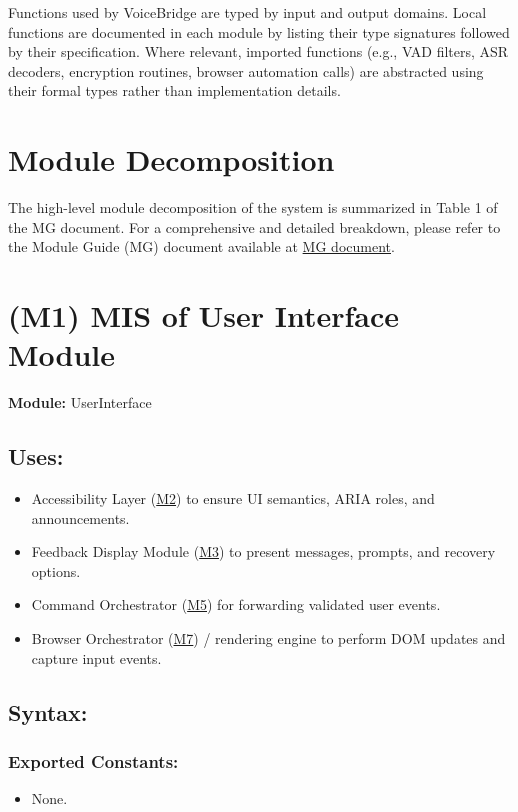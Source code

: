 \documentclass[12pt, titlepage]{article}
\begin{document}
\noindent
Functions used by VoiceBridge are typed by input and output domains.  
Local functions are documented in each module by listing their type signatures followed by their specification.
Where relevant, imported functions (e.g., VAD filters, ASR decoders, encryption routines, browser automation calls) are abstracted using their formal types rather than implementation details.



\section{Module Decomposition}
The high-level module decomposition of the system is summarized in Table 1 of the MG document. For a comprehensive and detailed breakdown, please refer to the Module Guide (MG) document available at \href{https://github.com/speech-buddies/VoiceBridge/blob/main/docs/Design/SoftArchitecture/MG.pdf}{MG document}.

\newpage
\section{(M1) MIS of User Interface Module} \label{M1}


\textbf{Module:} UserInterface

\subsection{Uses:}
\begin{itemize}
  \item Accessibility Layer (\hyperref[M2]{M2}) to ensure UI semantics, ARIA roles, and announcements.
  \item Feedback Display Module (\hyperref[M3]{M3}) to present messages, prompts, and recovery options.
  \item Command Orchestrator (\hyperref[M5]{M5}) for forwarding validated user events.
  \item Browser Orchestrator (\hyperref[M7]{M7}) / rendering engine to perform DOM updates and capture input events.
\end{itemize}

\subsection{Syntax:}

\subsubsection{Exported Constants:}
\begin{itemize}
  \item None.
\end{itemize}
\end{document}
